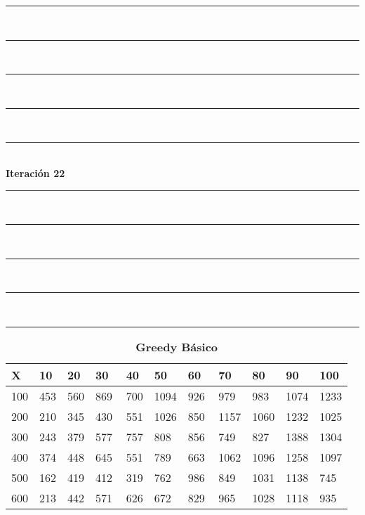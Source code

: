 \documentclass[10pt,letterpaper]{article}
\begin{document}
\newpage 
\begin{center}
\newcommand{\HRule}{\rule{\linewidth}{0.5mm}}
\center
\HRule\\[6cm]
\HRule\\[0.4cm]
\HRule\\[0.4cm]
\HRule\\[0.4cm]
\HRule\\[0.4cm]
{\centering \Huge\bfseries Iteración 22}\\[0.4cm]
\HRule\\[0.4cm]
\HRule\\[0.4cm]
\HRule\\[0.4cm]
\HRule\\[6cm]
\HRule
\end{center}
\newpage 
{}
\begin{center}
\begin{table}\renewcommand{\arraystretch}{2.5}
\caption{\large \textbf{Greedy Básico}}
\centering
\begin{tabular} { |m{0.5cm}|m{1.3cm}|m{1.3cm}|m{1.3cm}|m{1.3cm}|m{1.3cm}|m{1.3cm}|m{1.3cm}|m{1.3cm}|m{1.3cm}|m{1.3cm}|} 
\hline
\rowcolor{Gray}
\centering \textbf{X} & \centering \textbf{10} & \centering \textbf{20} & \centering \textbf{30}\ & \centering \textbf{40} & \centering \textbf{50} & \centering \textbf{60}\ & \centering \textbf{70} & \centering \textbf{80} & \centering \textbf{90}\ & \textbf{100} \\\hline
\cellcolor{Gray}100 & \Large 453 & \Large 560 & \Large 869 & \Large 700 & \Large 1094 & \Large 926 & \Large 979 & \Large 983 & \Large 1074 & \Large 1233 \\
\hline
\cellcolor{Gray}200 & \Large 210 & \Large 345 & \Large 430 & \Large 551 & \Large 1026 & \Large 850 & \Large 1157 & \Large 1060 & \Large 1232 & \Large 1025 \\
\hline
\cellcolor{Gray}300 & \Large 243 & \Large 379 & \Large 577 & \Large 757 & \Large 808 & \Large 856 & \Large 749 & \Large 827 & \Large 1388 & \Large 1304 \\
\hline
\cellcolor{Gray}400 & \Large 374 & \Large 448 & \Large 645 & \Large 551 & \Large 789 & \Large 663 & \Large 1062 & \Large 1096 & \Large 1258 & \Large 1097 \\
\hline
\cellcolor{Gray}500 & \Large 162 & \Large 419 & \Large 412 & \Large 319 & \Large 762 & \Large 986 & \Large 849 & \Large 1031 & \Large 1138 & \Large 745 \\
\hline
\cellcolor{Gray}600 & \Large 213 & \Large 442 & \Large 571 & \Large 626 & \Large 672 & \Large 829 & \Large 965 & \Large 1028 & \Large 1118 & \Large 935 \\

\end{tabular}
\end{table}
\end{center}
\end{document}

